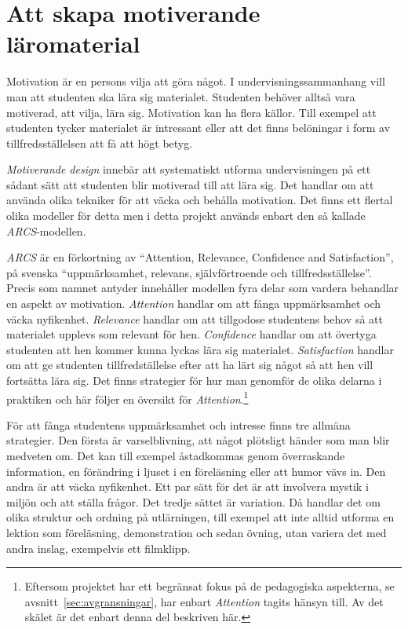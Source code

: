 \section{Att skapa motiverande läromaterial}\label{sec:arcs}
\begin{draft}
Motivation är en persons vilja att göra något. I undervisningssammanhang vill
man att studenten ska lära sig materialet. Studenten behöver alltså vara
motiverad, att vilja, lära sig. Motivation kan ha flera källor. Till exempel att
studenten tycker materialet är intressant eller att det finns belöningar i form
av tillfredsställelsen att få att högt betyg. 

\textit{Motiverande design} innebär att systematiskt utforma undervisningen på
ett sådant sätt att studenten blir motiverad till att lära sig. Det handlar om
att använda olika tekniker för att väcka och behålla motivation. Det finns ett
flertal olika modeller för detta men i detta projekt används enbart den så
kallade \textit{ARCS}-modellen.\cite{arcs_book}

\textit{ARCS} är en förkortning av ``Attention, Relevance, Confidence and
Satisfaction'', på svenska ``uppmärksamhet, relevans, självförtroende och
tillfredsställelse''. Precis som namnet antyder innehåller modellen fyra delar
som vardera behandlar en aspekt av motivation. \textit{Attention} handlar om att
fånga uppmärksamhet och väcka nyfikenhet. \textit{Relevance} handlar om att
tillgodose studentens behov så att materialet upplevs som relevant för hen.
\textit{Confidence} handlar om att övertyga studenten att hen kommer kunna
lyckas lära sig materialet. \textit{Satisfaction} handlar om att ge studenten
tillfredställelse efter att ha lärt sig något så att hen vill fortsätta lära
sig. Det finns strategier för hur man genomför de olika delarna i praktiken och
här följer en översikt för \textit{Attention}.\footnote{Eftersom projektet har
ett begränsat fokus på de pedagogiska aspekterna, se
avsnitt~\ref{sec:avgransningar}, har enbart \textit{Attention}  tagits hänsyn till. Av det skälet är det enbart denna
del beskriven här.}

För att fånga studentens uppmärksamhet och intresse finns tre allmäna
strategier. Den första är varselblivning, att något plötsligt händer som man
blir medveten om. Det kan till exempel åstadkommas genom överraskande
information, en förändring i ljuset i en föreläsning eller att humor vävs in.
Den andra är att väcka nyfikenhet. Ett par sätt för det är att involvera mystik
i miljön och att ställa frågor. Det tredje sättet är variation. Då handlar det
om olika struktur och ordning på utlärningen, till exempel att inte alltid
utforma en lektion som föreläsning, demonstration och sedan övning, utan variera
det med andra inslag, exempelvis ett filmklipp.



\end{draft}
